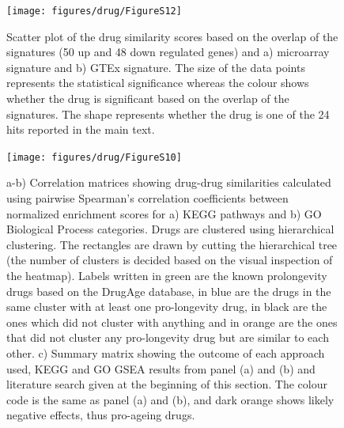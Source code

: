 \documentclass[12pt,twoside]{unicam}
\begin{document}
\begin{figure}

{\centering \texttt{[image: figures/drug/FigureS12]} 

}

\caption[Correlation between CMap results generated using the microarray and a combined ageing signature]{Scatter plot of the drug similarity scores based on the overlap of the signatures (50 up and 48 down regulated genes) and a) microarray signature and b) GTEx signature. The size of the data points represents the statistical significance whereas the colour shows whether the drug is significant based on the overlap of the signatures. The shape represents whether the drug is one of the 24 hits reported in the main text.}\label{fig:drugFigS12}
\end{figure}

\begin{figure}

{\centering \texttt{[image: figures/drug/FigureS10]} 

}

\caption[Similarities between significant drug hits at the gene expression, GO BP, KEGG and literature evidence levels]{a-b) Correlation matrices showing drug-drug similarities calculated using pairwise Spearman's correlation coefficients between normalized enrichment scores for a) KEGG pathways and b) GO Biological Process categories. Drugs are clustered using hierarchical clustering. The rectangles are drawn by cutting the hierarchical tree (the number of clusters is decided based on the visual inspection of the heatmap). Labels written in green are the known prolongevity drugs based on the DrugAge database, in blue are the drugs in the same cluster with at least one pro-longevity drug, in black are the ones which did not cluster with anything and in orange are the ones that did not cluster any pro-longevity drug but are similar to each other. c) Summary matrix showing the outcome of each approach used, KEGG and GO GSEA results from panel (a) and (b) and literature search given at the beginning of this section. The colour code is the same as panel (a) and (b), and dark orange shows likely negative effects, thus pro-ageing drugs.}\label{fig:drugFigS10}
\end{figure}
\end{document}
